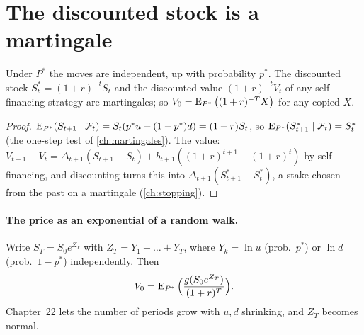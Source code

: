 \section{The discounted stock is a martingale}

\begin{result}
\label{res:multi-mg}
Under $P^*$ the moves are independent, up with probability $p^*$. The discounted stock $S_t^*=(1+r)^{-t}S_t$ and the discounted value $(1+r)^{-t}V_t$ of any self-financing strategy are martingales; so $V_0=\operatorname{E}_{P^*}\big((1+r)^{-T}X\big)$ for any copied $X$.
\end{result}
\begin{proof}
$\operatorname{E}_{P^*}(S_{t+1}\mid\mathcal F_t)=S_t(p^*u+(1-p^*)d)=(1+r)S_t$, so $\operatorname{E}_{P^*}(S^*_{t+1}\mid\mathcal F_t)=S^*_t$ (the one-step test of \cref{ch:martingales}). The value: $V_{t+1}-V_t=\Delta_{t+1}(S_{t+1}-S_t)+b_{t+1}((1+r)^{t+1}-(1+r)^t)$ by self-financing, and discounting turns this into $\Delta_{t+1}(S^*_{t+1}-S^*_t)$, a stake chosen from the past on a martingale (\cref{ch:stopping}).
\end{proof}

\paragraph{The price as an exponential of a random walk.} Write $S_T=S_0e^{Z_T}$ with $Z_T=Y_1+\dots+Y_T$, where $Y_k=\ln u$ (prob.\ $p^*$) or $\ln d$ (prob.\ $1-p^*$) independently. Then
\[
  V_0=\operatorname{E}_{P^*}\Big(\frac{g(S_0e^{Z_T})}{(1+r)^T}\Big).
\]
Chapter~22 lets the number of periods grow with $u,d$ shrinking, and $Z_T$ becomes normal.


